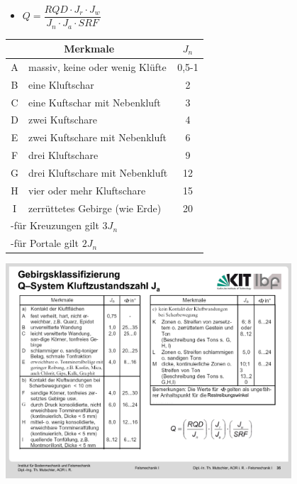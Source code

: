 \documentclass[fleqn,twoside]{article}
\begin{document}
\begin{itemize}
    \item $Q=\dfrac{RQD\cdot J_r\cdot J_w}{J_n\cdot J_a\cdot SRF}$
\end{itemize}
\begin{minipage}{0.5\textwidth}
    \begin{tabular}{|c|l|c|}\hline
            \multicolumn{2}{|c|}{Merkmale} & $J_n$ \\\hline
            A   & massiv, keine oder wenig Klüfte   & 0,5-1 \\
            B   & eine Kluftschar                   & 2     \\
            C   & eine Kuftschar mit Nebenkluft     & 3     \\
            D   & zwei Kuftschare                   & 4     \\
            E   & zwei Kuftschare mit Nebenkluft    & 6     \\
            F   & drei Kluftschare                  & 9     \\
            G   & drei Kluftschare mit Nebenkluft   & 12    \\
            H   & vier oder mehr Kluftschare        & 15    \\
            I   & zerrüttetes Gebirge (wie Erde)    & 20    \\\hline
            \multicolumn{3}{|l|}{-für Kreuzungen gilt $3J_n$}\\
            \multicolumn{3}{|l|}{-für Portale gilt $2J_n$}\\\hline
    \end{tabular}
    \includegraphics[width=0.8\textwidth]{Grafiken/J_aa.pdf}
\end{minipage}
\end{document}
